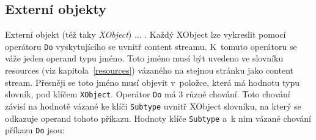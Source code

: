 \subsection*{Externí objekty} \label{XObject}
Externí objekt (též taky \emph{XObject}) ... .
Každý XObject lze vykreslit pomocí operátoru \texttt{Do} vyskytujícího se uvnitř
content streamu. K~tomuto operátoru se váže jeden operand typu jméno. Toto jméno
musí být uvedeno ve slovníku resources (viz kapitola~\ref{resources}) vázaného
na stejnou stránku jako content stream. Přesněji se toto jméno musí objevit
v~položce, která má hodnotu typu slovník, pod klíčem \texttt{XObject}. Operátor
\texttt{Do} má 3 různé chování. Toto chování závisí na hodnotě vázané ke klíči
\texttt{Subtype} uvnitř XObject slovníku, na který se odkazuje operand tohoto
příkazu. Hodnoty klíče \texttt{Subtype} a~k nim vázané chování příkazu
\texttt{Do} jsou:
